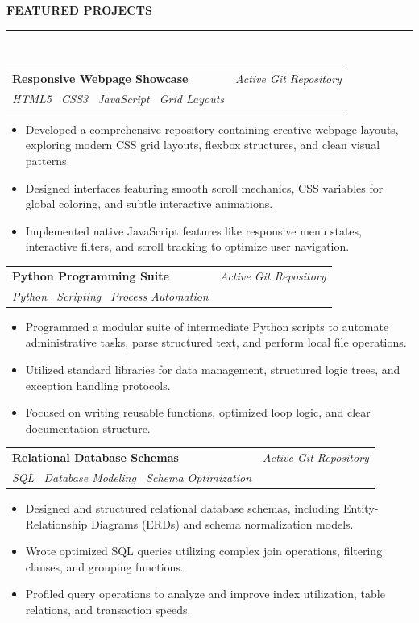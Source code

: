 \documentclass[10pt,a4paper]{article}
\makeatletter
\newlength{\MW}\setlength{\MW}{14.7cm}   %
\newcommand{\mHead}[1]{%
  \vspace{8pt}%
  {\color{Midnight}\bfseries\rmfamily\small\MakeUppercase{#1}}%
  \\[-4pt]{\color{RoseGold}\rule{\linewidth}{1.8pt}}\\[4pt]}
\newcommand{\projCard}[4]{%
  \begin{tcolorbox}[
    enhanced,colback=white,colframe=RoseGold,
    toprule=2pt,bottomrule=0.4pt,leftrule=0.4pt,rightrule=0.4pt,
    arc=3pt,left=7pt,right=7pt,top=3.5pt,bottom=3.5pt,
    before skip=0pt,after skip=5pt
  ]
    \begin{tabularx}{\linewidth}{@{}X r@{}}
      {\bfseries\color{Dark}\small #1} &
      {\itshape\color{Muted}\footnotesize #3}\\[-2pt]
      {\color{RoseGold}\footnotesize\itshape #2} &
    \end{tabularx}
    \begin{itemize}[leftmargin=1.1em,itemsep=0pt,parsep=0pt,topsep=2.5pt]
      \footnotesize\color{Dark} #4
    \end{itemize}
  \end{tcolorbox}}
\makeatother
\begin{document}
\begin{minipage}[t]{\MW}
  \vspace{4pt}
  \hspace*{14pt}%
  \begin{minipage}[t]{\MW-26pt}

    \mHead{Featured Projects}
    \projCard{Responsive Webpage Showcase}
      {HTML5 \textbullet\ CSS3 \textbullet\ JavaScript \textbullet\ Grid Layouts}
      {Active Git Repository}{
      \item Developed a comprehensive repository containing creative webpage layouts, exploring modern CSS grid layouts, flexbox structures, and clean visual patterns.
      \item Designed interfaces featuring smooth scroll mechanics, CSS variables for global coloring, and subtle interactive animations.
      \item Implemented native JavaScript features like responsive menu states, interactive filters, and scroll tracking to optimize user navigation.
    }
    \projCard{Python Programming Suite}
      {Python \textbullet\ Scripting \textbullet\ Process Automation}
      {Active Git Repository}{
      \item Programmed a modular suite of intermediate Python scripts to automate administrative tasks, parse structured text, and perform local file operations.
      \item Utilized standard libraries for data management, structured logic trees, and exception handling protocols.
      \item Focused on writing reusable functions, optimized loop logic, and clear documentation structure.
    }
    \projCard{Relational Database Schemas}
      {SQL \textbullet\ Database Modeling \textbullet\ Schema Optimization}
      {Active Git Repository}{
      \item Designed and structured relational database schemas, including Entity-Relationship Diagrams (ERDs) and schema normalization models.
      \item Wrote optimized SQL queries utilizing complex join operations, filtering clauses, and grouping functions.
      \item Profiled query operations to analyze and improve index utilization, table relations, and transaction speeds.
    }

    \vspace{10pt}
    

\end{minipage}
\end{minipage}
\end{document}
